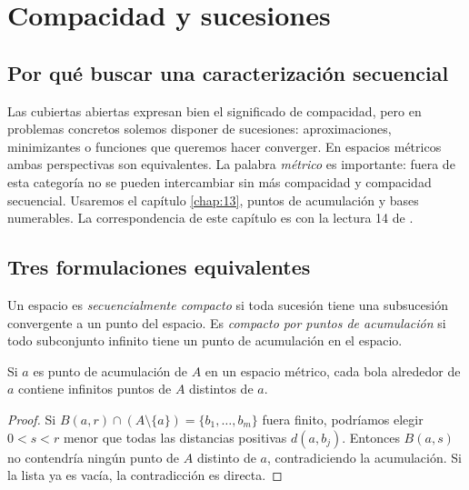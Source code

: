 \chapter{Compacidad y sucesiones}\label{chap:14}

\section{Por qué buscar una caracterización secuencial}
Las cubiertas abiertas expresan bien el significado de compacidad, pero en problemas concretos solemos disponer de sucesiones: aproximaciones, minimizantes o funciones que queremos hacer converger. En espacios métricos ambas perspectivas son equivalentes. La palabra \emph{métrico} es importante: fuera de esta categoría no se pueden intercambiar sin más compacidad y compacidad secuencial. Usaremos el capítulo \ref{chap:13}, puntos de acumulación y bases numerables. La correspondencia de este capítulo es con la lectura 14 de \cite{valencia}.

\section{Tres formulaciones equivalentes}
\begin{definicion}
Un espacio es \emph{secuencialmente compacto} si toda sucesión tiene una subsucesión convergente a un punto del espacio. Es \emph{compacto por puntos de acumulación} si todo subconjunto infinito tiene un punto de acumulación en el espacio.
\end{definicion}

\begin{lema}\label{ch14:acumulacion}
Si $a$ es punto de acumulación de $A$ en un espacio métrico, cada bola alrededor de $a$ contiene infinitos puntos de $A$ distintos de $a$.
\end{lema}
\begin{proof}
Si $B(a,r)\cap(A\setminus\{a\})=\{b_1,\ldots,b_m\}$ fuera finito, podríamos elegir $0<s<r$ menor que todas las distancias positivas $d(a,b_j)$. Entonces $B(a,s)$ no contendría ningún punto de $A$ distinto de $a$, contradiciendo la acumulación. Si la lista ya es vacía, la contradicción es directa.
\end{proof}

